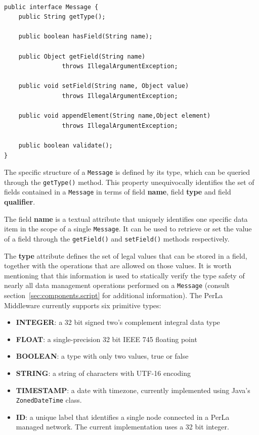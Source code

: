 ~\\
\lstset{language=Java}
\begin{lstlisting}[floatplacement=!hbt,caption=The Message
interface,label={lst:message}]
public interface Message {
    public String getType();

    public boolean hasField(String name);

    public Object getField(String name)
                throws IllegalArgumentException;

    public void setField(String name, Object value)
                throws IllegalArgumentException;

    public void appendElement(String name,Object element)
                throws IllegalArgumentException;

    public boolean validate();
}
\end{lstlisting}

The specific structure of a \texttt{Message} is defined by its type, which can
be queried through the \texttt{getType()} method. This property unequivocally
identifies the set of fields contained in a \texttt{Message} in terms of field
\textbf{name}, field \textbf{type} and field \textbf{qualifier}.

The field \textbf{name} is a textual attribute that uniquely identifies one
specific data item in the scope of a single \texttt{Message}. It can be used to
retrieve or set the value of a field through the \texttt{getField()} and
\texttt{setField()} methods respectively.

The \textbf{type} attribute defines the set of legal values that can be stored
in a field, together with the operations that are allowed on those values. It
is worth mentioning that this information is used to statically verify the type
safety of nearly all data management operations performed on a \texttt{Message}
(consult section~\ref{sec:components.script} for additional information). The
PerLa Middleware currently supports six primitive types:

\begin{itemize}

  \item \textbf{INTEGER}: a 32 bit signed two's complement integral data type

  \item \textbf{FLOAT}: a single-precision 32 bit IEEE 745 floating point

  \item \textbf{BOOLEAN}: a type with only two values, true or false

  \item \textbf{STRING}: a string of characters with UTF-16 encoding

  \item \textbf{TIMESTAMP}: a date with timezone, currently implemented using
      Java's \texttt{ZonedDateTime} class.

  \item \textbf{ID}: a unique label that identifies a single node connected in
      a PerLa managed network. The current implementation uses a 32 bit
      integer. 

\end{itemize}

